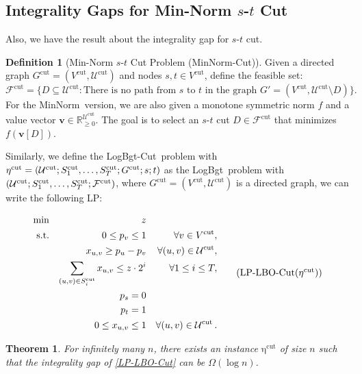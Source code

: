 \documentclass[11pt,a4paper]{article} \usepackage{enumitem}
\newcommand{\assigned}[1]{[ #1 ]}
\newcommand{\calF}{\mathcal{F}}
\newcommand{\calU}{\mathcal{U}}
\newcommand{\boldv}{\boldsymbol{v}}
\newcommand{\minnorm}{\textsf{MinNorm}}
\newcommand{\LBO}{\textsf{LogBgt}}
\newcommand{\minnormcut}{\textsf{MinNorm-Cut}}
\newcommand{\LBOcut}{\textsf{LogBgt-Cut}}
\newcommand{\cutU}{\operatorname{\calU^{cut}}}
\newcommand{\cutS}[1]{\ifx\relax#1\relax
    S^{\operatorname{cut}} \else
    S^{\operatorname{cut}}_{#1} \fi
}
\newcommand{\cutF}{\operatorname{\calF^{cut}}}
\newcommand{\cuteta}{\operatorname{\eta^{cut}}}
\newcommand{\cutG}{G^{\operatorname{cut}}}
\newcommand{\cutV}{V^{\operatorname{cut}}}
\newtheorem{theorem}{Theorem}[section]
\theoremstyle{definition}
\newtheorem{definition}{Definition}[section]
\begin{document}
 
\subsection{Integrality Gaps for Min-Norm $s$-$t$ Cut} 
Also, we have the result about the integrality gap for $s$-$t$ cut.
\begin{definition}[Min-Norm $s$-$t$ Cut Problem (\minnormcut)]
Given a directed graph $\cutG = (\cutV, \cutU)$ and nodes $s, t \in \cutV$, define the feasible set:
$$
\cutF = \{D \subseteq \cutU : \text{There is no path from } s \text{ to } t \text{ in the graph } G' = (\cutV, \cutU \setminus D)\}.
$$
For the \minnorm\ version, we are also given a monotone symmetric norm $f$ and a value vector $\boldv \in \mathbb{R}_{\geq 0}^{\cutU}$. The goal is to select an $s$-$t$ cut $D \in \cutF$ that minimizes $f(\boldv\assigned{D})$.
\end{definition}

Similarly, we define the \LBOcut\ problem with $\cuteta = (\cutU; \cutS{1}, \ldots, \cutS{T}; \cutG; s; t)$ as the \LBO\ problem with $(\cutU; \cutS{1}, \ldots, \cutS{T}; \cutF)$, where $\cutG = (\cutV, \cutU)$ is a directed graph, we can write the following LP:

\begin{equation}
\begin{aligned}
    \min && z && \\
    \text{s.t.} && 0 \leq p_v \leq 1 && \forall v \in \cutV,\\
    && x_{u, v} \geq p_u - p_v && \forall (u, v) \in \cutU,\\
    && \sum_{(u, v) \in \cutS{i}} x_{u, v} \leq z \cdot 2^{i} && \forall 1 \leq i \leq T,\\
    && p_s = 0 && \\
    && p_t = 1 && \\
    && 0 \leq x_{u, v} \leq 1 && \forall (u, v) \in \cutU.
\end{aligned}
\tag{LP-LBO-Cut($\cuteta$)}
\label{LP-LBO-Cut}
\end{equation}

\begin{theorem}\label{thm:intgap-2}
For infinitely many $n$, there exists an instance $\cuteta$ of size $n$ such that the integrality gap of \cref{LP-LBO-Cut} can be $\Omega(\log n)$. 
\end{theorem}
\end{document}
